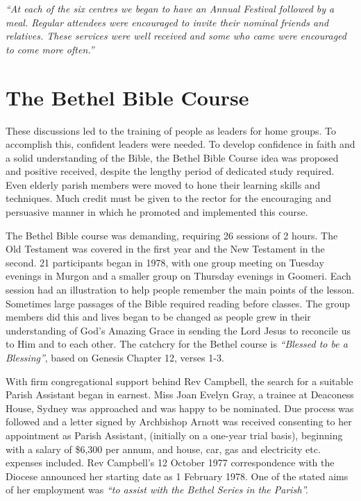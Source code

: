 \emph{``At each of the six centres we began to have an Annual Festival followed by a meal. Regular attendees were encouraged to invite their nominal friends and relatives. These services were well received and some who came were encouraged to come more often.''}



\section{The Bethel Bible Course}



These discussions led to the training of people as leaders for home groups. To accomplish this, confident leaders were needed. To develop confidence in faith and a solid understanding of the Bible, the Bethel Bible Course idea was proposed and positive received, despite the lengthy period of dedicated study required. Even elderly parish members were moved to hone their learning skills and techniques. Much credit must be given to the rector for the encouraging and persuasive manner in which he promoted and implemented this course.



The Bethel Bible course was demanding, requiring 26 sessions of 2  hours. The Old Testament was covered in the first year and the New Testament in the second. 21 participants began in 1978, with one group meeting on Tuesday evenings in Murgon and a smaller group on Thursday evenings in Goomeri. Each session had an illustration to help people remember the main points of the lesson. Sometimes large passages of the Bible required reading before classes. The group members did this and lives began to be changed as people grew in their understanding of God's Amazing Grace in sending the Lord Jesus to reconcile us to Him and to each other. The catchcry for the Bethel course is \emph{``Blessed to be a Blessing''}, based on Genesis Chapter 12, verses 1-3.



With firm congregational support behind Rev Campbell, the search for a suitable Parish Assistant began in earnest. Miss Joan Evelyn Gray, a trainee at Deaconess House, Sydney was approached and was happy to be nominated. Due process was followed and a letter signed by Archbishop Arnott was received consenting to her appointment as Parish Assistant, (initially on a one-year trial basis), beginning with a salary of \$6,300 per annum, and house, car, gas and electricity etc. expenses included. Rev Campbell's 12 October 1977 correspondence with the Diocese announced her starting date as 1 February 1978. One of the stated aims of her employment was \emph{``to assist with the Bethel Series in the Parish''.}









